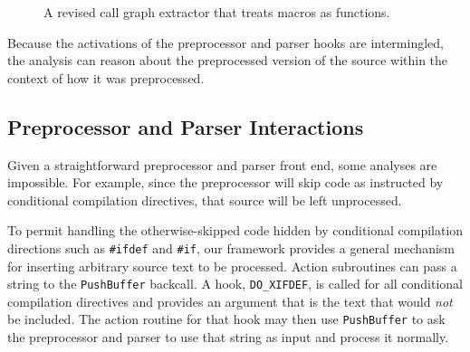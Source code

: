 \documentclass{article}
\newcommand{\ppd}[1]{\texttt{\##1}}
\begin{document}
\begin{figure}[hbt]
\begin{center}
\begin{small}
\end{small}
\caption{A revised call graph extractor that treats macros as functions.}
\label{fig:rev_call_graph_extractor}
\end{center}
\end{figure}

Because the activations of the preprocessor and parser hooks
are intermingled, the analysis can reason about the preprocessed version 
of the source within the context of how it was preprocessed.  

\subsection{Preprocessor and Parser Interactions}
\label{sec:interactions}

Given a straightforward preprocessor and parser front end, some analyses
are impossible.  For example, since the preprocessor will skip code as
instructed by conditional compilation directives, that source will be
left unprocessed.

To permit handling the otherwise-skipped code hidden by conditional
compilation directions such as \ppd{ifdef} and \ppd{if}, our framework
provides a general mechanism for inserting arbitrary source text to be
processed.  Action subroutines can pass a string to the \texttt{PushBuffer}
backcall.  A hook, \texttt{DO\_XIFDEF}, is called for all conditional
compilation directives and provides an argument that is the text that
would \emph{not} be included.  The action routine for that hook may then
use \texttt{PushBuffer} to ask the preprocessor and parser to use that
string as input and process it normally.
\end{document}
